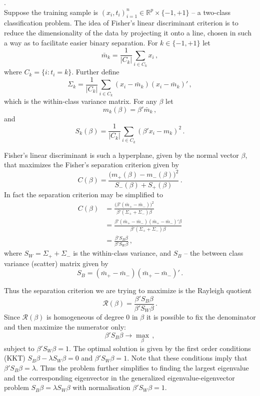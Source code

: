 \documentclass[a4paper]{article}
\newcommand{\Real}{\mathbb{R}}
\begin{document}
 .\hfill\\
Suppose the training sample is $(x_i, t_i)_{i=1}^n \in \Real^p \times\{-1,+1\}$ --
a two-class classification problem. The idea of Fisher's linear discriminant
criterion is to reduce the dimensionality of the data by projecting it onto a line,
chosen in such a way as to facilitate easier binary separation. For $k\in\{-1,+1\}$
let
\[ \bar{m}_k = \frac{1}{|C_k|} \sum_{i\in C_k} x_i \,, \]
where $C_k = \{ i : t_i = k \}$. Further define
\[
\Sigma_k = \frac{1}{|C_k|} \sum_{i\in C_k} ( x_i - \bar{m}_k )( x_i - \bar{m}_k )'\,,
\]
which is the within-class variance matrix. For any $\beta$ let
\[ m_k(\beta) = \beta'\bar{m}_k\,, \] 
and
\[ S_k(\beta) = \frac{1}{|C_k|} \sum_{i\in C_k} ( \beta'x_i - m_k )^2 \,. \]

Fisher's linear discriminant is such a hyperplane, given by the normal vector $\beta$,
that maximizes the Fisher's separation criterion given by
\[ C(\beta) = \frac{\bigl(m_+(\beta)-m_-(\beta)\bigr)^2}{ S_-(\beta) + S_+(\beta) }\,. \]
In fact the separation criterion may be simplified to
\begin{align*}
	C(\beta)
	&= \frac{\bigl(\beta'(\bar{m}_+ - \bar{m}_-)\bigr)^2}{ \beta'( \Sigma_+ + \Sigma_- )\beta }\\
	&= \frac{\beta'(\bar{m}_+ - \bar{m}_-)(\bar{m}_+ - \bar{m}_-)'\beta}{ \beta'( \Sigma_+ + \Sigma_- )\beta }\\
	&= \frac{\beta'S_B\beta}{ \beta'S_W\beta }\,,
\end{align*}
where $S_W = \Sigma_+ + \Sigma_-$ is the within-class variance, and $S_B$ --
the between class variance (scatter) matrix given by
\[ S_B = (\bar{m}_+ - \bar{m}_-)(\bar{m}_+ - \bar{m}_-)'\,. \]

Thus the separation criterion we are trying to maximize is the Rayleigh quotient
\[ \mathcal{R}(\beta) = \frac{\beta'S_B\beta}{\beta'S_W\beta}\,. \]
Since $\mathcal{R}(\beta)$ is homogeneous of degree $0$ in $\beta$ it is possible
to fix the denominator and then maximize the numerator only:
\[ \beta'S_B\beta \to \max_\beta \,,\]
subject to $\beta'S_W\beta = 1$. The optimal solution is given by the first order
conditions (KKT) $S_B\beta - \lambda S_W \beta = 0$ and $\beta'S_W\beta = 1$.
Note that these conditions imply that $\beta'S_B\beta = \lambda$. Thus the problem
further simplifies to finding the largest eigenvalue and the corresponding eigenvector
in the generalized eigenvalue-eigenvector problem $S_B\beta = \lambda S_W\beta$ with
normalisation $\beta'S_W\beta = 1$.
\end{document}
